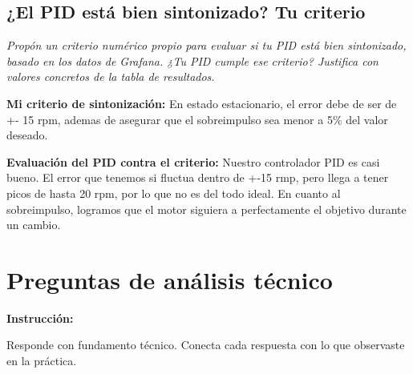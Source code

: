 \documentclass[11pt, letterpaper]{article}
\newenvironment{instruccion}{%
  \begin{mdframed}[backgroundcolor=tealLight,linecolor=tealMain,linewidth=1pt,
    innerleftmargin=10pt,innerrightmargin=10pt,
    innertopmargin=6pt,innerbottommargin=6pt]
  \small\textbf{\color{tealMain}Instrucci\'on:}\hspace{4pt}
}{\end{mdframed}}
\begin{document}
\subsection{¿El PID está bien sintonizado? Tu criterio}

\textit{Propón un criterio num\'erico propio para evaluar si tu PID
est\'a bien sintonizado, basado en los datos de Grafana.
¿Tu PID cumple ese criterio? Justifica con valores concretos
de la tabla de resultados.}

\textbf{Mi criterio de sintonización:}
En estado estacionario, el error debe de ser de +- 15 rpm, ademas de asegurar que el sobreimpulso sea menor a 5\% del valor deseado.

\textbf{Evaluación del PID contra el criterio:}
Nuestro controlador PID es casi bueno. El error que tenemos si fluctua dentro de +-15 rmp, pero llega a tener picos de hasta 20 rpm, por lo que no es del todo ideal. 
En cuanto al sobreimpulso, logramos que el motor siguiera a perfectamente el objetivo durante un cambio.

\newpage

\section{Preguntas de análisis técnico}

\begin{instruccion}
  Responde con fundamento t\'ecnico. Conecta cada respuesta
  con lo que observaste en la pr\'actica.
\end{instruccion}
\end{document}
